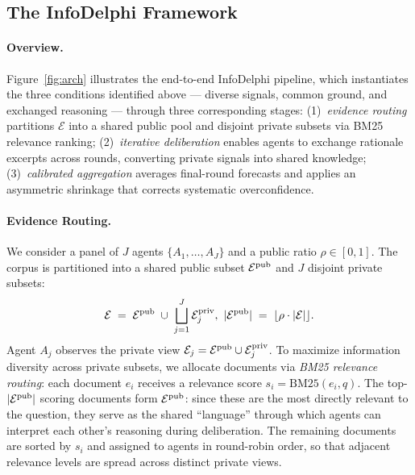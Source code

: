 \subsection{The InfoDelphi Framework}

\paragraph{Overview.}
Figure~\ref{fig:arch} illustrates the end-to-end InfoDelphi pipeline, which instantiates the three conditions identified above --- diverse signals, common ground, and exchanged reasoning --- through three corresponding stages:
(1)~\textit{evidence routing} partitions $\mathcal{E}$ into a shared public pool and disjoint private subsets via BM25 relevance ranking;
(2)~\textit{iterative deliberation} enables agents to exchange rationale excerpts across rounds, converting private signals into shared knowledge;
(3)~\textit{calibrated aggregation} averages final-round forecasts and applies an asymmetric shrinkage that corrects systematic overconfidence.

\paragraph{Evidence Routing.}
\label{sec:routing}
We consider a panel of $J$ agents $\{A_1, \dots, A_J\}$ and a public ratio $\rho \in [0,1]$.
The corpus is partitioned into a shared public subset $\mathcal{E}^{\mathrm{pub}}$ and $J$ disjoint private subsets:
\begin{equation}
  \mathcal{E} \;=\; \mathcal{E}^{\mathrm{pub}} \;\cup\; \bigsqcup_{j=1}^{J} \mathcal{E}_{j}^{\mathrm{priv}},
  \ |\mathcal{E}^{\mathrm{pub}}| \;=\; \lfloor \rho \cdot |\mathcal{E}| \rfloor.
  \label{eq:partition}
\end{equation}
Agent $A_j$ observes the private view $\mathcal{E}_{j} = \mathcal{E}^{\mathrm{pub}} \cup \mathcal{E}_{j}^{\mathrm{priv}}$.
To maximize information diversity across private subsets, we allocate documents via \textit{BM25 relevance routing}: each document $e_i$ receives a relevance score $s_i = \mathrm{BM25}(e_i, q)$.
The top-$|\mathcal{E}^{\mathrm{pub}}|$ scoring documents form $\mathcal{E}^{\mathrm{pub}}$: since these are the most directly relevant to the question, they serve as the shared ``language'' through which agents can interpret each other's reasoning during deliberation.
The remaining documents are sorted by $s_i$ and assigned to agents in round-robin order, so that adjacent relevance levels are spread across distinct private views.

